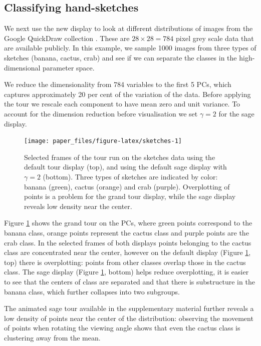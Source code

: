 \documentclass[]{interact}
\theoremstyle{plain}%
\theoremstyle{definition}
\theoremstyle{remark}
\begin{document}
\hypertarget{sec:appl2}{%
\subsection{Classifying hand-sketches}\label{sec:appl2}}

We next use the new display to look at different distributions of images
from the Google QuickDraw collection \citep{quickdraw-paper}. These are
\(28\times28=784\) pixel grey scale data that are available publicly. In
this example, we sample 1000 images from three types of sketches
(banana, cactus, crab) and see if we can separate the classes in the
high-dimensional parameter space.

We reduce the dimensionality from 784 variables to the first 5 PCs,
which captures approximately 20 per cent of the variation of the data.
Before applying the tour we rescale each component to have mean zero and
unit variance. To account for the dimension reduction before
visualisation we set \(\gamma=2\) for the sage display.

\begin{figure}

{\centering \texttt{[image: paper\_files/figure-latex/sketches-1]} 

}

\caption{Selected frames  of the tour run on the sketches data using the default tour display (top), and using the default sage display with $\gamma=2$ (bottom). Three types of sketches are indicated by color: banana (green), cactus (orange) and crab (purple). Overplotting of points is a problem for the grand tour display, while the sage display reveals low density near the center.}\label{fig:sketches}
\end{figure}

Figure \ref{fig:sketches} shows the grand tour on the PCs, where green
points correspond to the banana class, orange points represent the
cactus class and purple points are the crab class. In the selected
frames of both displays points belonging to the cactus class are
concentrated near the center, however on the default display (Figure
\ref{fig:sketches}, top) there is overplotting: points from other
classes overlap those in the cactus class. The sage display (Figure
\ref{fig:sketches}, bottom) helps reduce overplotting, it is easier to
see that the centers of class are separated and that there is
substructure in the banana class, which further collapses into two
subgroups.

The animated sage tour available in the supplementary material further
reveals a low density of points near the center of the distribution:
observing the movement of points when rotating the viewing angle shows
that even the cactus class is clustering away from the mean.
\end{document}
